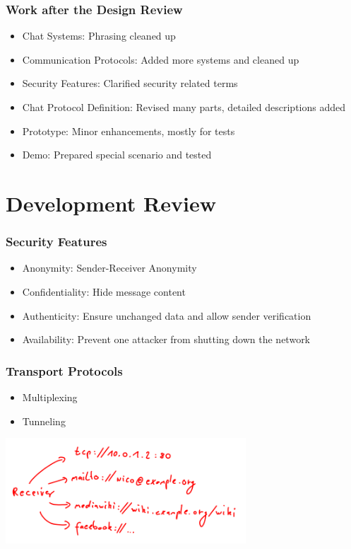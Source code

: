 \documentclass{beamer}
\begin{document}
\frame
{
    \frametitle{Work after the Design Review}
    \begin{itemize}
    \item Chat Systems: Phrasing cleaned up
    \item Communication Protocols: Added more systems and cleaned up
    \item Security Features: Clarified security related terms
    \item Chat Protocol Definition: Revised many parts, detailed descriptions added
    \item Prototype: Minor enhancements, mostly for tests
    \item Demo: Prepared special scenario and tested
    \end{itemize}
}

\section{Development Review}


\frame
{
  \frametitle{Security Features}
  \begin{itemize}
          \item Anonymity: Sender-Receiver Anonymity
          \item Confidentiality: Hide message content
          \item Authenticity: Ensure unchanged data and allow sender verification
          \item Availability: Prevent one attacker from shutting down the network
   \end{itemize}
}

\frame
{
  \frametitle{Transport Protocols}
  \begin{itemize}
      \item Multiplexing
      \item Tunneling
  \end{itemize}
  \begin{center}
   \includegraphics[width=9cm]{../addressmultiplexing.png}
  \end{center}
}
\end{document}
